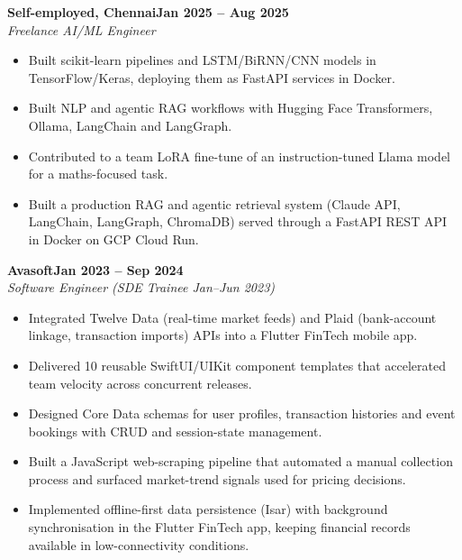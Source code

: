\documentclass[a4paper,11pt]{article}
\newcommand{\entry}[4]{\needspace{4\baselineskip}\noindent\textbf{#1}\hfill\textbf{#2}\\ \textit{#3}\hfill\textit{#4}\par}
\begin{document}
\vspace{4pt}
\entry{Self-employed, Chennai}{Jan 2025 – Aug 2025}{Freelance AI/ML Engineer}{}
\begin{itemize}
  \item Built scikit-learn pipelines and LSTM/BiRNN/CNN models in TensorFlow/Keras, deploying them as FastAPI services in Docker.
  \item Built NLP and agentic RAG workflows with Hugging Face Transformers, Ollama, LangChain and LangGraph.
  \item Contributed to a team LoRA fine-tune of an instruction-tuned Llama model for a maths-focused task.
  \item Built a production RAG and agentic retrieval system (Claude API, LangChain, LangGraph, ChromaDB) served through a FastAPI REST API in Docker on GCP Cloud Run.
\end{itemize}
\vspace{4pt}
\entry{Avasoft}{Jan 2023 – Sep 2024}{Software Engineer (SDE Trainee Jan–Jun 2023)}{}
\begin{itemize}
  \item Integrated Twelve Data (real-time market feeds) and Plaid (bank-account linkage, transaction imports) APIs into a Flutter FinTech mobile app.
  \item Delivered 10 reusable SwiftUI/UIKit component templates that accelerated team velocity across concurrent releases.
  \item Designed Core Data schemas for user profiles, transaction histories and event bookings with CRUD and session-state management.
  \item Built a JavaScript web-scraping pipeline that automated a manual collection process and surfaced market-trend signals used for pricing decisions.
  \item Implemented offline-first data persistence (Isar) with background synchronisation in the Flutter FinTech app, keeping financial records available in low-connectivity conditions.
\end{itemize}

\end{document}
